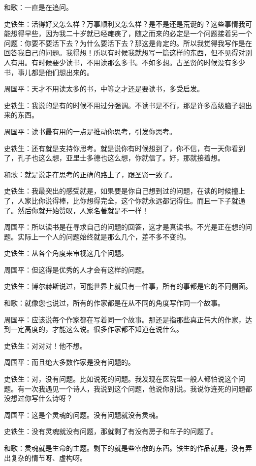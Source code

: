 \documentclass[fontset=fandol,12pt,a5paper]{ctexbook}
\begin{document}
和歌：一直是在追问。

史铁生：活得好又怎么样？万事顺利又怎么样？是不是还是荒诞的？这些事情我可能想得早些，因为我二十岁就已经瘫痪了，随之而来的必定是一个问题接着另一个问题：你要不要活下去？为什么要活下去？那这是肯定的。所以我觉得我写作是在回答我自己的问题。我得想！所以有时候我就想写一篇这样的东西，但不见得对别人有用。有时候要少读书，不用读那么多书。不如多想。古圣贤的时候没有多少书，事儿都是他们想出来的。

周国平：天才不用读太多的书，中等之才还是要读书，多受启发。

史铁生：我说的是有的时候不用过分强调。不读书是不行，那是许多高级脑子想出来的东西。

周国平：读书最有用的一点是推动你思考，引发你思考。

史铁生：还有就是支持你思考。就是说你有时候想到了，你不信，有一天你看到了，孔子也这么想，亚里士多德也这么想，你就信了。好，那就接着想。

和歌：就是说走在思考的正确的路上了，跟圣贤一致了。

史铁生：我最突出的感受就是，如果要是你自己想到过的问题，在读的时候撞上了，人家比你说得棒，比你想得完全，这个你就永远都记得住。而且一下子就通了。然后你就开始赞叹，人家名著就是不一样！

周国平：所以读书是在寻求自己的问题的回答，这才是真读书。不光是正在想的问题。实际上一个人的问题始终就是那么几个，差不多不变的。

史铁生：从各个角度来审视这几个问题。

周国平：但这得是优秀的人才会有这样的问题。

史铁生：博尔赫斯说过，可能世界上就只有一件事，所有的事都是它的不同侧面。

和歌：就像您也说过，所有的作家都是在从不同的角度写作同一个故事。

周国平：应该说每个作家都在写着同一个故事。那还是指那些真正伟大的作家，达到一定高度的，才能这么说。很多作家都不知道在说什么。

史铁生：对对对！他不想。

周国平：而且绝大多数作家是没有问题的。

史铁生：对，没有问题。比如说死的问题。我发现在医院里一般人都怕说这个问题。有一次我遇见一个诗人，我说到这个问题，他说你别说。我说你连死的问题都没想过你写什么诗呀？

周国平：这是个灵魂的问题。没有问题就没有灵魂。

史铁生：没有灵魂就没有问题，那就剩了有没有房子和车子的问题了。

和歌：灵魂就是生命的主题。剩下的就是些零散的东西。铁生的作品就是，没有弄出复杂的情节呀、虚构呀。
\end{document}

